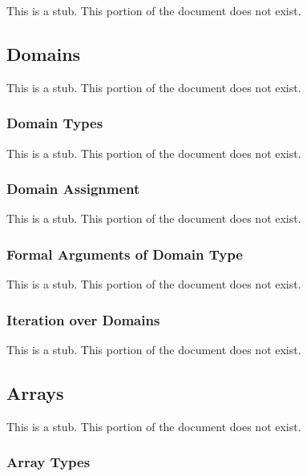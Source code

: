 \label{Domains_and_Arrays}

This is a stub.  This portion of the document does not exist.

\subsection{Domains}
\label{Domains}

This is a stub.  This portion of the document does not exist.

\subsubsection{Domain Types}
\label{Domain_Types}

This is a stub.  This portion of the document does not exist.

\subsubsection{Domain Assignment}
\label{Domain_Assignment}

This is a stub.  This portion of the document does not exist.

\subsubsection{Formal Arguments of Domain Type}
\label{Formal_Arguments_of_Domain_Type}

This is a stub.  This portion of the document does not exist.

\subsubsection{Iteration over Domains}
\label{Iteration_over_Domains}

This is a stub.  This portion of the document does not exist.

\subsection{Arrays}
\label{Arrays}

This is a stub.  This portion of the document does not exist.

\subsubsection{Array Types}
\label{Array_Types}

